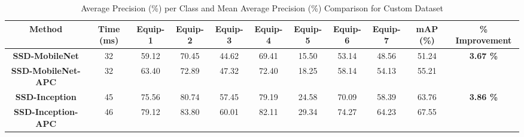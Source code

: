 \documentclass[conference]{IEEEtran}
\begin{document}
\begin{table}
\centering
\caption{Average Precision (\%) per Class and Mean Average Precision (\%) Comparison for Custom Dataset}
\label{customdata}
\begin{tabular}{|c|c|c|c|c|c|c|c|c|c|c|}
\hline
\multirow{1}{*}{\textbf{Method}} &
\multirow{1}{*}{\textbf{Time (ms)}} &
\multirow{1}{*}{\textbf{Equip-1}} & \multirow{1}{*}{\textbf{Equip-2}} & \multirow{1}{*}{\textbf{Equip-3}} & \multirow{1}{*}{\textbf{Equip-4}} & \multirow{1}{*}{\textbf{Equip-5}} & \multirow{1}{*}{\textbf{Equip-6}} & \multirow{1}{*}{\textbf{Equip-7}} & \multirow{1}{*}{\textbf{mAP (\%)}} & \multirow{1}{*}{\textbf{\% Improvement}}\\ \hline \hline

\textbf{SSD-MobileNet} & 32 & 59.12 & 70.45 & 44.62 & 69.41 & 15.50 & 53.14 & 48.56 & 51.24 & \multirow{2}{*}{\textbf{3.67 \%}}\\ 
\textbf{SSD-MobileNet-APC} & 32 & 63.40 & 72.89 & 47.32 & 72.40 & 18.25 & 58.14 & 54.13 & 55.21 & \\ \hline
\textbf{SSD-Inception} & 45 & 75.56 & 80.74 & 57.45 & 79.19 & 24.58 & 70.09 & 58.39 & 63.76 & \multirow{2}{*}{\textbf{3.86 \%}}\\
\textbf{SSD-Inception-APC} & 46 & 79.12 & 83.80 & 60.01 & 82.11 & 29.34 & 74.27 & 64.23 & 67.55 & \\ \hline
\end{tabular}
\end{table}
\end{document}
